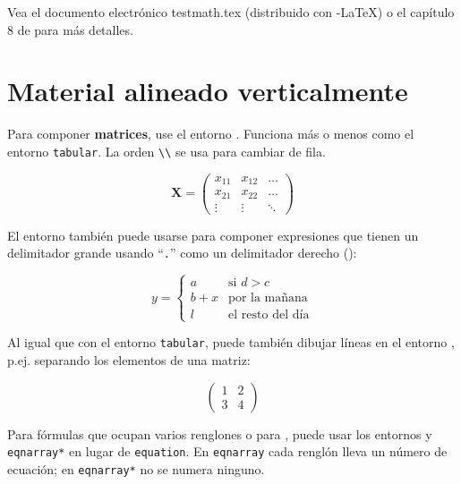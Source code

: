 Vea el documento electrónico testmath.tex (distribuido con \AmS-\LaTeX) o el capítulo 8 de \companion{} para más detalles.

\section{Material alineado verticalmente}
\label{sec:vert}

Para componer \textbf{matrices}, use el entorno .  Funciona más o menos como el entorno \texttt{tabular}.  La orden \verb|\\| se usa para cambiar de fila.
\begin{example}
\begin{displaymath}
\mathbf{X} =
\left( \begin{array}{ccc}
x_{11} & x_{12} & \ldots \\
x_{21} & x_{22} & \ldots \\
\vdots & \vdots & \ddots
\end{array} \right)
\end{displaymath}
\end{example}

El entorno  también puede usarse para componer expresiones que tienen un delimitador grande usando  ``\verb|.|'' como un delimitador derecho ():
\begin{example}
\begin{displaymath}
y = \left\{ \begin{array}{ll}
 a & \textrm{si $d>c$}\\
 b+x & \textrm{por la mañana}\\
 l & \textrm{el resto del día}
  \end{array} \right.
\end{displaymath}
\end{example}

Al igual que con el entorno \verb|tabular|, puede también dibujar líneas en el entorno  , p.ej. separando los elementos de una matriz:
\begin{example}
\begin{displaymath}
\left(\begin{array}{c|c}
 1 & 2 \\
\hline
3 & 4
\end{array}\right)
\end{displaymath}
\end{example}


Para fórmulas que ocupan varios renglones o para , puede usar los entornos  y \verb|eqnarray*| en lugar de \texttt{equation}. En \texttt{eqnarray} cada renglón lleva un número de ecuación;  en \verb|eqnarray*| no se numera ninguno.

